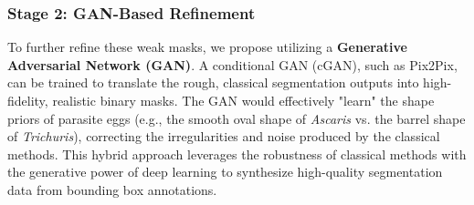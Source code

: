 \subsubsection{Stage 2: GAN-Based Refinement}
To further refine these weak masks, we propose utilizing a \textbf{Generative Adversarial Network (GAN)}. A conditional GAN (cGAN), such as Pix2Pix, can be trained to translate the rough, classical segmentation outputs into high-fidelity, realistic binary masks. The GAN would effectively "learn" the shape priors of parasite eggs (e.g., the smooth oval shape of \textit{Ascaris} vs. the barrel shape of \textit{Trichuris}), correcting the irregularities and noise produced by the classical methods. This hybrid approach leverages the robustness of classical methods with the generative power of deep learning to synthesize high-quality segmentation data from bounding box annotations.
